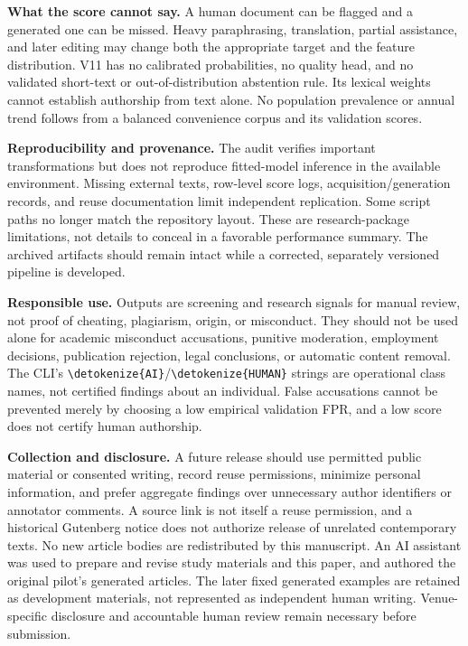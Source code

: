 \documentclass[11pt]{article}
\newcommand{\code}[1]{\expandafter\nolinkurl\expandafter{\detokenize{#1}}}
\begin{document}
\textbf{What the score cannot say.} A human document can be flagged and a
generated one can be missed. Heavy paraphrasing, translation, partial
assistance, and later editing may change both the appropriate target and
the feature distribution. V11 has no calibrated probabilities, no quality
head, and no validated short-text or out-of-distribution abstention rule.
Its lexical weights cannot establish authorship from text alone. No
population prevalence or annual trend follows from a balanced convenience
corpus and its validation scores.

\textbf{Reproducibility and provenance.} The audit verifies important
transformations but does not reproduce fitted-model inference in the
available environment. Missing external texts, row-level score logs,
acquisition/generation records, and reuse documentation limit independent
replication. Some script paths no longer match the repository layout.
These are research-package limitations, not details to conceal in a
favorable performance summary. The archived artifacts should remain intact
while a corrected, separately versioned pipeline is developed.

\textbf{Responsible use.} Outputs are screening and research signals for
manual review, not proof of cheating, plagiarism, origin, or misconduct.
They should not be used alone for academic misconduct accusations, punitive
moderation, employment decisions, publication rejection, legal conclusions,
or automatic content removal. The CLI's \code{AI}/\code{HUMAN} strings are
operational class names, not certified findings about an individual. False
accusations cannot be prevented merely by choosing a low empirical validation
FPR, and a low score does not certify human authorship.

\textbf{Collection and disclosure.} A future release should use permitted
public material or consented writing, record reuse permissions, minimize
personal information, and prefer aggregate findings over unnecessary author
identifiers or annotator comments. A source link is not itself a reuse
permission, and a historical Gutenberg notice does not authorize release
of unrelated contemporary texts. No new article bodies are redistributed
by this manuscript. An AI assistant was used to prepare and revise study
materials and this paper, and authored the original pilot's generated
articles. The later fixed generated examples are retained as development
materials, not represented as independent human writing. Venue-specific
disclosure and accountable human review remain necessary before submission.
\end{document}
